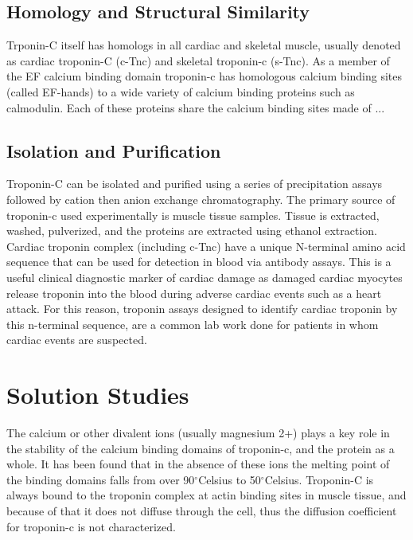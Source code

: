\documentclass[12pt]{article}
\newcommand{\degrees}{{$^{\circ}$}}
\begin{document}
\subsection{Homology and Structural Similarity}
Trponin-C itself has homologs in all cardiac and skeletal muscle, usually denoted as cardiac troponin-C (c-Tnc) and skeletal troponin-c (s-Tnc). As a member of the EF calcium binding domain troponin-c has homologous calcium binding sites (called EF-hands) to a wide variety of calcium binding proteins such as calmodulin. Each of these proteins share the calcium binding sites made of ...

\subsection{Isolation and Purification}
Troponin-C can be isolated and purified using a series of precipitation assays followed by cation then anion exchange chromatography. The primary source of troponin-c used experimentally is muscle tissue samples. Tissue is extracted, washed, pulverized, and the proteins are extracted using ethanol extraction. Cardiac troponin complex (including c-Tnc) have a unique N-terminal amino acid sequence that can be used for detection in blood via antibody assays. This is a useful clinical diagnostic marker of cardiac damage as damaged cardiac myocytes release troponin into the blood during adverse cardiac events such as a heart attack. For this reason, troponin assays designed to identify cardiac troponin by this n-terminal sequence, are a common lab work done for patients in whom cardiac events are suspected.

\section{Solution Studies}
The calcium or other divalent ions (usually magnesium 2+) plays a key role in the stability of the calcium binding domains of troponin-c, and the protein as a whole. It has been found that in the absence of these ions the melting point of the binding domains falls from over 90\degrees Celsius to 50\degrees Celsius. Troponin-C is always bound to the troponin complex at actin binding sites in muscle tissue, and because of that it does not diffuse through the cell, thus the diffusion coefficient for troponin-c is not characterized.
\end{document}
